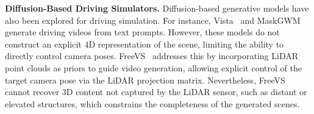 \textbf{Diffusion-Based Driving Simulators.}  
Diffusion-based generative models have also been explored for driving simulation. For instance, Vista~\cite{gao2024vista} and MaskGWM~\cite{ni2025maskgwm} generate driving videos from text prompts. However, these models do not construct an explicit 4D representation of the scene, limiting the ability to directly control camera poses. FreeVS~\cite{wang2024freevs} addresses this by incorporating LiDAR point clouds as priors to guide video generation, allowing explicit control of the target camera pose via the LiDAR projection matrix. Nevertheless, FreeVS cannot recover 3D content not captured by the LiDAR sensor, such as distant or elevated structures, which constrains the completeness of the generated scenes.